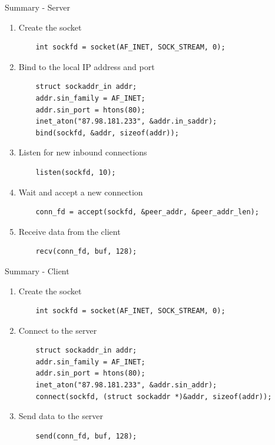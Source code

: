\begin{frame}[fragile]{Summary - Server}
	\begin{enumerate}
		\item Create the socket \\
			\begin{verbatim}
    int sockfd = socket(AF_INET, SOCK_STREAM, 0);
			\end{verbatim}
		\item Bind to the local IP address and port \\
			\begin{verbatim}
    struct sockaddr_in addr;
    addr.sin_family = AF_INET;
    addr.sin_port = htons(80);
    inet_aton("87.98.181.233", &addr.in_saddr);
    bind(sockfd, &addr, sizeof(addr));
			\end{verbatim}
		\item Listen for new inbound connections \\
			\begin{verbatim}
    listen(sockfd, 10);
			\end{verbatim}
		\item Wait and accept a new connection \\
			\begin{verbatim}
    conn_fd = accept(sockfd, &peer_addr, &peer_addr_len);
			\end{verbatim}
		\item Receive data from the client \\
			\begin{verbatim}
    recv(conn_fd, buf, 128);
			\end{verbatim}
	\end{enumerate}
\end{frame}

\begin{frame}[fragile]{Summary - Client}
	\begin{enumerate}
		\item Create the socket \\
			\begin{verbatim}
    int sockfd = socket(AF_INET, SOCK_STREAM, 0);
			\end{verbatim}
		\item Connect to the server \\
			\begin{verbatim}
    struct sockaddr_in addr;
    addr.sin_family = AF_INET;
    addr.sin_port = htons(80);
    inet_aton("87.98.181.233", &addr.sin_addr);
    connect(sockfd, (struct sockaddr *)&addr, sizeof(addr));
			\end{verbatim}
		\item Send data to the server \\
			\begin{verbatim}
    send(conn_fd, buf, 128);
			\end{verbatim}
	\end{enumerate}
\end{frame}


